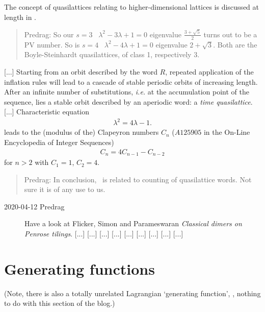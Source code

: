 The concept of quasilattices
relating to higher-dimensional lattices is discussed at length in
. %

\begin{quote}
Predrag: So our ${s}=3$ \templatt\ $\lambda^{2}-3\lambda+1=0$ eigenvalue
$\frac{3+\sqrt{5}}{2}$ turns out to be a PV number. So is
${s}=4$ \templatt\ $\lambda^{2}-4\lambda+1=0$ eigenvalue
$2+\sqrt{3}$.
Both are the Boyle-Steinhardt quasilattices, of class 1,
respectively 3.
\end{quote}
[...]
Starting from an orbit described by the word $R$, repeated application of
the inflation rules will lead to a cascade of stable periodic orbits of
increasing length. After an infinite number of substitutions, \emph{i.e.}
at the accumulation point of the sequence, lies a stable orbit described
by an aperiodic word: a \emph{time quasilattice}.
[...]
Characteristic equation
%
\begin{align}
\lambda^2=4\lambda-1.
\end{align}
leads to the (modulus of the)
Clapeyron numbers $C_n$ ($A125905$ in the
 {On-Line Encyclopedia} of
Integer Sequences)
\begin{align}
C_n=4C_{n-1}-C_{n-2}
\end{align}
for $n>2$ with $C_1=1$, $C_2=4$.
\begin{quote}
Predrag: In conclusion, \templatt\ is related to counting
of quasilattice words. Not sure it is of any use to us.
\end{quote}


\begin{description}

\item[2020-04-12 Predrag] Have a look at
Flicker, Simon and Parameswaran
{\em Classical dimers on {Penrose} tilings}.
[...]
[...]
[...]
[...]
[...]
[...]
[...]
[...]
[...]

\end{description}



\section{Generating functions}
\label{sect:genFuncts}

(Note, there is also a totally unrelated Lagrangian `generating function',
, nothing to do with this section of the blog.)
\bigskip

